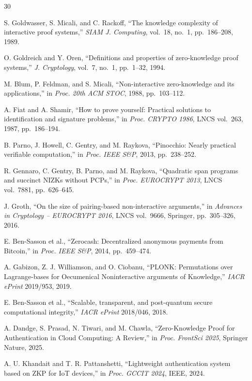 \documentclass[12pt,a4paper,oneside]{report}
\begin{document}
\begin{thebibliography}{30}

S. Goldwasser, S. Micali, and C. Rackoff, ``The knowledge complexity of interactive
proof systems,'' \textit{SIAM J. Computing}, vol.~18, no.~1, pp.~186--208, 1989.

O. Goldreich and Y. Oren, ``Definitions and properties of zero-knowledge proof
systems,'' \textit{J. Cryptology}, vol.~7, no.~1, pp.~1--32, 1994.

M. Blum, P. Feldman, and S. Micali, ``Non-interactive zero-knowledge and its
applications,'' in \textit{Proc. 20th ACM STOC}, 1988, pp.~103--112.

A. Fiat and A. Shamir, ``How to prove yourself: Practical solutions to identification
and signature problems,'' in \textit{Proc. CRYPTO 1986}, LNCS vol.~263, 1987,
pp.~186--194.

B. Parno, J. Howell, C. Gentry, and M. Raykova, ``Pinocchio: Nearly practical
verifiable computation,'' in \textit{Proc. IEEE S\&P}, 2013, pp.~238--252.

R. Gennaro, C. Gentry, B. Parno, and M. Raykova, ``Quadratic span programs and
succinct NIZKs without PCPs,'' in \textit{Proc. EUROCRYPT 2013}, LNCS vol.~7881,
pp.~626--645.

J. Groth, ``On the size of pairing-based non-interactive arguments,'' in
\textit{Advances in Cryptology -- EUROCRYPT 2016}, LNCS vol.~9666, Springer,
pp.~305--326, 2016.

E. Ben-Sasson et al., ``Zerocash: Decentralized anonymous payments from Bitcoin,''
in \textit{Proc. IEEE S\&P}, 2014, pp.~459--474.

A. Gabizon, Z. J. Williamson, and O. Ciobanu, ``PLONK: Permutations over
Lagrange-bases for Oecumenical Noninteractive arguments of Knowledge,''
\textit{IACR ePrint} 2019/953, 2019.

E. Ben-Sasson et al., ``Scalable, transparent, and post-quantum secure computational
integrity,'' \textit{IACR ePrint} 2018/046, 2018.

A. Dandge, S. Prasad, N. Tiwari, and M. Chawla, ``Zero-Knowledge Proof for
Authentication in Cloud Computing: A Review,'' in \textit{Proc. FrontSci 2025},
Springer Nature, 2025.

A. U. Khandait and T. R. Pattanshetti, ``Lightweight authentication system based
on ZKP for IoT devices,'' in \textit{Proc. GCCIT 2024}, IEEE, 2024.


\end{thebibliography}
\end{document}
